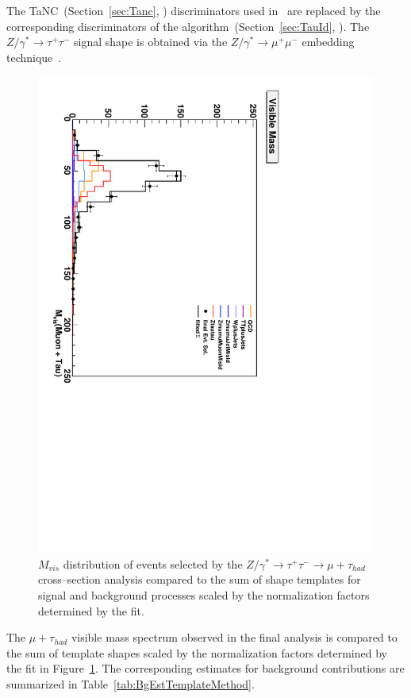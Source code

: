 The TaNC~(Section~\ref{sec:Tanc}, \cite{CMS_AN_2010-099}) discriminators used
in~\cite{CMS_AN_2011-021} are replaced by the corresponding discriminators of
the \hpsTanc algorithm~(Section~\ref{sec:TauId}, \cite{CMS_AN_2010-082}).  The
$Z/\gamma^{*} \to \tau^{+} \tau^{-}$ signal shape is obtained via the
$Z/\gamma^{*} \to \mu^{+} \mu^{-}$ embedding technique~\cite{MCEmbedding}.
\begin{figure}
\setlength{\unitlength}{1mm}
\begin{center}
\includegraphics*[height=0.85\textwidth, angle=90, viewport=0 0 375
540]{backgrounds_chapter/figures/fitBgEstTemplateZtoMuTau_visMass.pdf}
\caption[Visible mass distribution in the final fit of the template
method]{\captiontext $M_{vis}$ distribution of events selected by the
\mbox{$Z/\gamma^{*} \rightarrow \tau^{+} \tau^{-} \rightarrow \mu + \tau_{had}$}
cross--section analysis compared to the sum of shape templates for signal and
background processes scaled by the normalization factors determined by the fit.}
\label{fig:TemplateFitControlPlot}
\end{center}
\end{figure} 
The $\mu + \tau_{had}$ visible mass spectrum observed in the final analysis is
compared to the sum of template shapes scaled by the normalization factors
determined by the fit in Figure~\ref{fig:TemplateFitControlPlot}.  The
corresponding estimates for background contributions are summarized in
Table~\ref{tab:BgEstTemplateMethod}.

